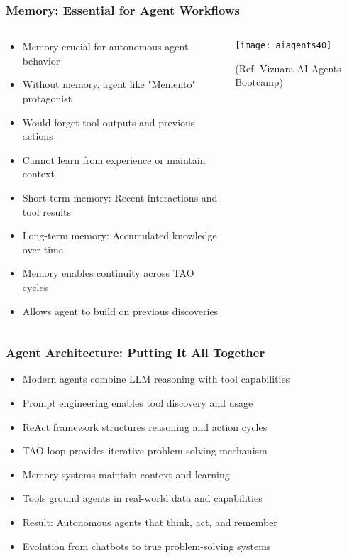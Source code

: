 \begin{frame}[fragile]\frametitle{Memory: Essential for Agent Workflows}

\begin{columns}
    \begin{column}[T]{0.6\linewidth}
      \begin{itemize}
	  \item Memory crucial for autonomous agent behavior
	  \item Without memory, agent like "Memento" protagonist
	  \item Would forget tool outputs and previous actions
	  \item Cannot learn from experience or maintain context
	  \item Short-term memory: Recent interactions and tool results
	  \item Long-term memory: Accumulated knowledge over time
	  \item Memory enables continuity across TAO cycles
	  \item Allows agent to build on previous discoveries
	  \end{itemize}

    \end{column}
    \begin{column}[T]{0.4\linewidth}
		\begin{center}
		\texttt{[image: aiagents40]}

		{\tiny (Ref: Vizuara AI Agents Bootcamp)}

		\end{center}	
    \end{column}
  \end{columns}
  
\end{frame}

\begin{frame}[fragile]\frametitle{Agent Architecture: Putting It All Together}
      \begin{itemize}
	  \item Modern agents combine LLM reasoning with tool capabilities
	  \item Prompt engineering enables tool discovery and usage
	  \item ReAct framework structures reasoning and action cycles
	  \item TAO loop provides iterative problem-solving mechanism
	  \item Memory systems maintain context and learning
	  \item Tools ground agents in real-world data and capabilities
	  \item Result: Autonomous agents that think, act, and remember
	  \item Evolution from chatbots to true problem-solving systems
	  \end{itemize}
\end{frame}

